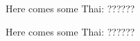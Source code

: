 \documentclass{report}
\begin{document}
Here comes some Thai: ??????

{\sffamily Here comes some Thai: ??????}
\end{document}

